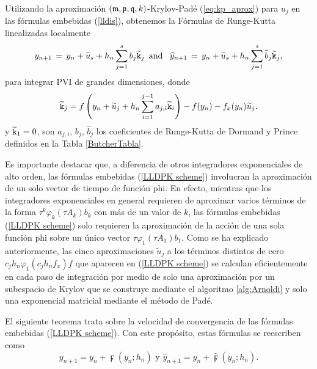 Utilizando la aproximación $(\mathfrak{m} , \mathfrak{p} ,\mathfrak{q} , k)$-Krylov-Padé (\ref{eq:kp_aprox}) para $u_j$ en las fórmulas embebidas (\ref{lldis}), obtenemos la Fórmulas de Runge-Kutta linealizadas localmente
\begin{equation}  \label{LLDPK scheme}
    y_{n+1}\,=\,y_n+\widetilde{u}_s+h_n \sum_{j=1}^{s}b_j \widetilde{\mathtt{k}}_j \,\,\, \text{and} \,\,\, \
    \widehat{y}_{n+1}\,=\, y_n+\widetilde{u}_s+h_n \sum_{j=1}^{s}\widehat{b}_j \widetilde{\mathtt{k}}_j,
\end{equation}
para integrar PVI de grandes dimensiones, donde
\begin{equation*}
    \widetilde{\mathtt{k}}_j = f\left( y_n+\widetilde{u}_j+h_n \sum_{i=1}^{j-1}a_{j,i}\widetilde{\mathtt{k}}_i \right) - f( y_n) - f_x(y_n)\widetilde{u}_j.
\end{equation*}
y $\widetilde{\mathtt{k}}_1=0$, son $a_{j,i}$, $b_j$, $\widehat{b}_j$ los coeficientes de Runge-Kutta de  Dormand y Prince definidos en la Tabla \ref{ButcherTabla}.

Es importante destacar que, a diferencia de otros integradores exponenciales de alto orden, las fórmulas embebidas (\ref{LLDPK scheme}) involucran la aproximación de un solo vector de tiempo de función phi. En efecto, mientras que los integradores exponenciales en general requieren de aproximar varios términos de la forma $\tau^k \varphi_k(\tau A_k)b_k$ con más de un valor de $k$, las fórmulas embebidas (\ref{LLDPK scheme}) solo requieren la aproximación de la acción de una sola función phi sobre un único vector $\tau \varphi_1(\tau A_1)b_1$. Como se ha explicado anteriormente, las cinco aproximaciones $\widetilde{u}_j$ a los términos distintos de cero $c_jh_n\varphi_1(c_jh_nf_x)f$ que aparecen en (\ref{LLDPK scheme}) se calculan eficientemente en cada paso de integración por medio de solo una aproximación por un subespacio de Krylov que se construye mediante el algoritmo \ref{alg:Arnoldi} y solo una exponencial matricial mediante el método de Padé.

El siguiente teorema trata sobre la velocidad de convergencia de las fórmulas embebidas (\ref{LLDPK scheme}). Con este propósito, estas fórmulas se reescriben como
\begin{equation*}
    y_{n+1}=y_{n}+\digamma (y_{n};h_{n})\text{ \ \ \ \ y \ \ \ \ }\widehat{y}_{n+1}=y_{n}+\widehat{\digamma }(y_{n};h_{n}).
\end{equation*}


